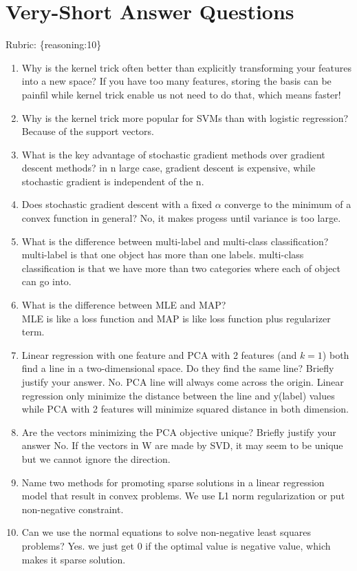 \documentclass{article}
\def\rubric#1{\gre{Rubric: \{#1\}}}{}
\def\gre#1{{\color{gre}#1}}
\def\enum#1{\begin{enumerate}#1\end{enumerate}}
\begin{document}
\section{Very-Short Answer Questions}
\rubric{reasoning:10}

\enum{
\item Why is the kernel trick often better than explicitly transforming your features into a new space?
\gre{If you have too many features, storing the basis can be painfil while kernel trick enable us not need to do that, which means faster!}
\item Why is the kernel trick more popular for SVMs than with logistic regression?
\gre{Because of the support vectors.}
\item What is the key advantage of stochastic gradient methods over gradient descent methods?
\gre{in n large case, gradient descent is expensive, while stochastic gradient is independent of the n.}
\item Does stochastic gradient descent with a fixed $\alpha$ converge to the minimum of a convex function in general?
\gre{No, it makes progess until variance is too large.}
\item What is the difference between multi-label and multi-class classification?
\gre{multi-label is that one object has more than one labels. multi-class classification is that we have more than two categories where each of object can go into.}
\item What is the difference between MLE and MAP?\\
\gre{MLE is like a loss function and MAP is like loss function plus regularizer term.}
\item Linear regression with one feature and PCA with 2 features (and $k=1$) both find a line in a two-dimensional space. Do they find the same line?
 Briefly justify your answer.
 \gre{No. PCA line will always come across the origin. Linear regression only minimize the distance between the line and y(label) values while PCA with 2 features will minimize squared distance in both dimension.}
\item Are the vectors minimizing the PCA objective unique? Briefly justify your answer
\gre{No. If the vectors in W are made by SVD, it may seem to be unique but we cannot ignore the direction.}
\item Name two methods for promoting sparse solutions in a linear regression model that result in convex problems.
\gre{We use L1 norm regularization or put non-negative constraint.}
\item Can we use the normal equations to solve non-negative least squares problems?
\gre{Yes. we just get $0$ if the optimal value is negative value, which makes it sparse solution.}
}
\end{document}
